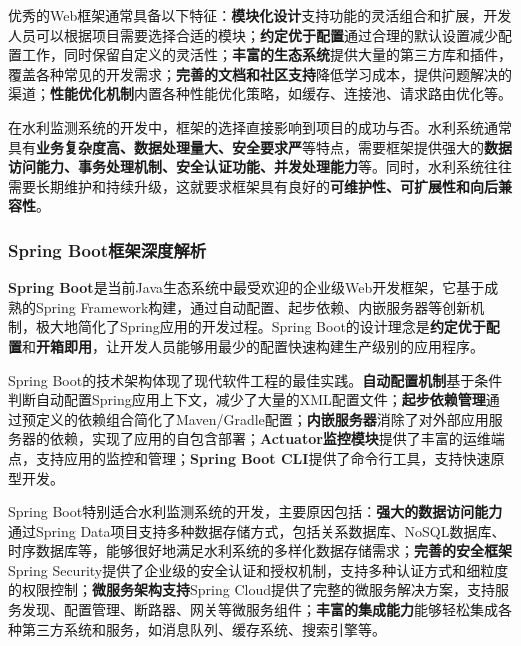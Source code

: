 优秀的Web框架通常具备以下特征：\textbf{模块化设计}支持功能的灵活组合和扩展，开发人员可以根据项目需要选择合适的模块；\textbf{约定优于配置}通过合理的默认设置减少配置工作，同时保留自定义的灵活性；\textbf{丰富的生态系统}提供大量的第三方库和插件，覆盖各种常见的开发需求；\textbf{完善的文档和社区支持}降低学习成本，提供问题解决的渠道；\textbf{性能优化机制}内置各种性能优化策略，如缓存、连接池、请求路由优化等。

在水利监测系统的开发中，框架的选择直接影响到项目的成功与否。水利系统通常具有\textbf{业务复杂度高、数据处理量大、安全要求严}等特点，需要框架提供强大的\textbf{数据访问能力、事务处理机制、安全认证功能、并发处理能力}等。同时，水利系统往往需要长期维护和持续升级，这就要求框架具有良好的\textbf{可维护性、可扩展性和向后兼容性}。

\subsubsection{Spring Boot框架深度解析}\label{spring-bootux6846ux67b6ux6df1ux5ea6ux89e3ux6790}

\textbf{Spring Boot}是当前Java生态系统中最受欢迎的企业级Web开发框架，它基于成熟的Spring Framework构建，通过自动配置、起步依赖、内嵌服务器等创新机制，极大地简化了Spring应用的开发过程。Spring Boot的设计理念是\textbf{约定优于配置}和\textbf{开箱即用}，让开发人员能够用最少的配置快速构建生产级别的应用程序。

Spring Boot的技术架构体现了现代软件工程的最佳实践。\textbf{自动配置机制}基于条件判断自动配置Spring应用上下文，减少了大量的XML配置文件；\textbf{起步依赖管理}通过预定义的依赖组合简化了Maven/Gradle配置；\textbf{内嵌服务器}消除了对外部应用服务器的依赖，实现了应用的自包含部署；\textbf{Actuator监控模块}提供了丰富的运维端点，支持应用的监控和管理；\textbf{Spring Boot CLI}提供了命令行工具，支持快速原型开发。

Spring Boot特别适合水利监测系统的开发，主要原因包括：\textbf{强大的数据访问能力}通过Spring Data项目支持多种数据存储方式，包括关系数据库、NoSQL数据库、时序数据库等，能够很好地满足水利系统的多样化数据存储需求；\textbf{完善的安全框架}Spring Security提供了企业级的安全认证和授权机制，支持多种认证方式和细粒度的权限控制；\textbf{微服务架构支持}Spring Cloud提供了完整的微服务解决方案，支持服务发现、配置管理、断路器、网关等微服务组件；\textbf{丰富的集成能力}能够轻松集成各种第三方系统和服务，如消息队列、缓存系统、搜索引擎等。

